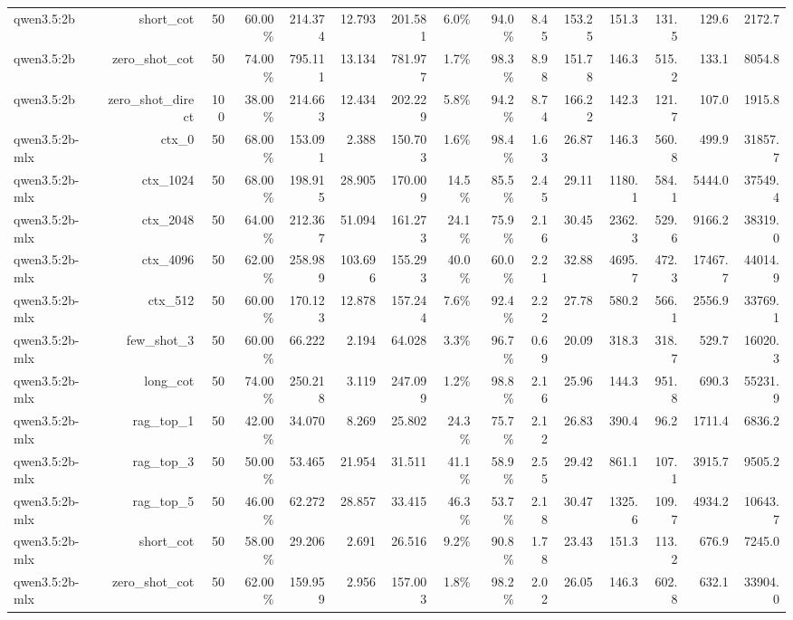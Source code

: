 \begin{table}[t]
\begin{tabular}{lrrrrrrrrrrrrrr}
qwen3.5:2b & short\_cot & 50 & 60.00\% & 214.374 & 12.793 & 201.581 & 6.0\% & 94.0\% & 8.45 & 153.25 & 151.3 & 131.5 & 129.6 & 2172.7 \\
qwen3.5:2b & zero\_shot\_cot & 50 & 74.00\% & 795.111 & 13.134 & 781.977 & 1.7\% & 98.3\% & 8.98 & 151.78 & 146.3 & 515.2 & 133.1 & 8054.8 \\
qwen3.5:2b & zero\_shot\_direct & 100 & 38.00\% & 214.663 & 12.434 & 202.229 & 5.8\% & 94.2\% & 8.74 & 166.22 & 142.3 & 121.7 & 107.0 & 1915.8 \\
qwen3.5:2b-mlx & ctx\_0 & 50 & 68.00\% & 153.091 & 2.388 & 150.703 & 1.6\% & 98.4\% & 1.63 & 26.87 & 146.3 & 560.8 & 499.9 & 31857.7 \\
qwen3.5:2b-mlx & ctx\_1024 & 50 & 68.00\% & 198.915 & 28.905 & 170.009 & 14.5\% & 85.5\% & 2.45 & 29.11 & 1180.1 & 584.1 & 5444.0 & 37549.4 \\
qwen3.5:2b-mlx & ctx\_2048 & 50 & 64.00\% & 212.367 & 51.094 & 161.273 & 24.1\% & 75.9\% & 2.16 & 30.45 & 2362.3 & 529.6 & 9166.2 & 38319.0 \\
qwen3.5:2b-mlx & ctx\_4096 & 50 & 62.00\% & 258.989 & 103.696 & 155.293 & 40.0\% & 60.0\% & 2.21 & 32.88 & 4695.7 & 472.3 & 17467.7 & 44014.9 \\
qwen3.5:2b-mlx & ctx\_512 & 50 & 60.00\% & 170.123 & 12.878 & 157.244 & 7.6\% & 92.4\% & 2.22 & 27.78 & 580.2 & 566.1 & 2556.9 & 33769.1 \\
qwen3.5:2b-mlx & few\_shot\_3 & 50 & 60.00\% & 66.222 & 2.194 & 64.028 & 3.3\% & 96.7\% & 0.69 & 20.09 & 318.3 & 318.7 & 529.7 & 16020.3 \\
qwen3.5:2b-mlx & long\_cot & 50 & 74.00\% & 250.218 & 3.119 & 247.099 & 1.2\% & 98.8\% & 2.16 & 25.96 & 144.3 & 951.8 & 690.3 & 55231.9 \\
qwen3.5:2b-mlx & rag\_top\_1 & 50 & 42.00\% & 34.070 & 8.269 & 25.802 & 24.3\% & 75.7\% & 2.12 & 26.83 & 390.4 & 96.2 & 1711.4 & 6836.2 \\
qwen3.5:2b-mlx & rag\_top\_3 & 50 & 50.00\% & 53.465 & 21.954 & 31.511 & 41.1\% & 58.9\% & 2.55 & 29.42 & 861.1 & 107.1 & 3915.7 & 9505.2 \\
qwen3.5:2b-mlx & rag\_top\_5 & 50 & 46.00\% & 62.272 & 28.857 & 33.415 & 46.3\% & 53.7\% & 2.18 & 30.47 & 1325.6 & 109.7 & 4934.2 & 10643.7 \\
qwen3.5:2b-mlx & short\_cot & 50 & 58.00\% & 29.206 & 2.691 & 26.516 & 9.2\% & 90.8\% & 1.78 & 23.43 & 151.3 & 113.2 & 676.9 & 7245.0 \\
qwen3.5:2b-mlx & zero\_shot\_cot & 50 & 62.00\% & 159.959 & 2.956 & 157.003 & 1.8\% & 98.2\% & 2.02 & 26.05 & 146.3 & 602.8 & 632.1 & 33904.0 \\

\end{tabular}
\end{table}
